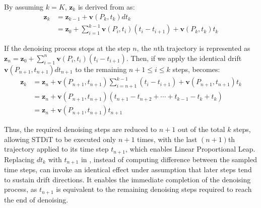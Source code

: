 By assuming $k=K$, $\boldsymbol{z}_{k}$ is derived from  as:
\begin{equation}
\begin{split}
    \boldsymbol{z}_k &= \boldsymbol{z}_{k-1} + \boldsymbol{v}(P_k,t_k)dt_k
    \\
    &= \boldsymbol{z}_0 + \sum_{i=1}^{k-1} \boldsymbol{v}(P_i,t_i) ({t_i-t_{i+1}}) + \boldsymbol{v}(P_k, t_k) t_k
\end{split}
    \label{eq:rflow2}
\end{equation}

\noindent If the denoising process stops at the step $n$, the $n$th trajectory is represented as $\boldsymbol{z}_n = \boldsymbol{z}_0 + \sum_{i=1}^{n} \boldsymbol{v}(P_i,t_i) ({t_i-t_{i+1}})$. Then, if we apply the identical drift $\boldsymbol{v}(P_{n+1},t_{n+1})dt_{n+1}$ to the remaining $n+1 \leq i \leq k$ steps,  becomes:
\begin{equation}
\begin{split}
    \boldsymbol{z}_k &{=} \boldsymbol{z}_n {+} \boldsymbol{v}(P_{n+1},t_{n+1}) \sum_{i={n+1}}^{k-1}(t_i {-} t_{i+1}) {+} \boldsymbol{v}(P_{n+1},t_{n+1}) t_k
    \\
    &{=} \boldsymbol{z}_n {+} \boldsymbol{v}(P_{n+1},t_{n+1}) (t_{n+1} {-} t_{n+2} {+} \cdots {+} t_{k-1} {-} t_k {+} t_k)
    \\
    &{=} \boldsymbol{z}_n {+} \boldsymbol{v}(P_{n+1},t_{n+1}) t_{n+1}
\end{split}
    \label{eq:lpl}
\end{equation}

\noindent Thus, the required denoising steps are reduced to $n+1$ out of the total $k$ steps, allowing STDiT to be executed only $n+1$ times, with the last $(n+1)$th trajectory applied to its time step $t_{n+1}$, which enables Linear Proportional Leap.
Replacing $dt_{k}$ with $t_{n+1}$ in , instead of computing difference between the sampled time steps, can invoke an identical effect under assumption that later steps tend to sustain drift directions. %
It enables the immediate completion of the denoising process, as $t_{n+1}$ is equivalent to the remaining denoising steps required to reach the end of denoising.

